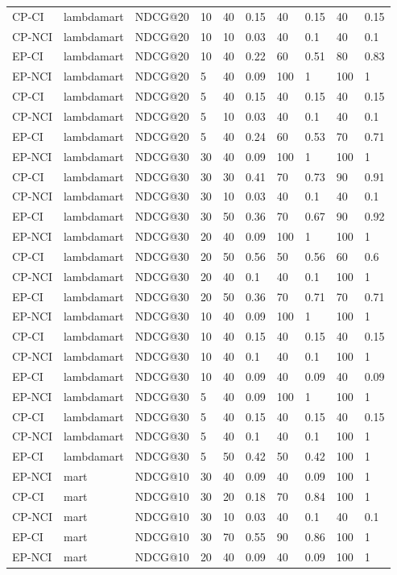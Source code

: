 \begin{landscape}
\begin{longtable}{|*{10}{l|}}
CP-CI&lambdamart&NDCG@20&10&40&0.15&40&0.15&40&0.15\\
CP-NCI&lambdamart&NDCG@20&10&10&0.03&40&0.1&40&0.1\\
EP-CI&lambdamart&NDCG@20&10&40&0.22&60&0.51&80&0.83\\
\hline
EP-NCI&lambdamart&NDCG@20&5&40&0.09&100&1&100&1\\
CP-CI&lambdamart&NDCG@20&5&40&0.15&40&0.15&40&0.15\\
CP-NCI&lambdamart&NDCG@20&5&10&0.03&40&0.1&40&0.1\\
EP-CI&lambdamart&NDCG@20&5&40&0.24&60&0.53&70&0.71\\
\hline
EP-NCI&lambdamart&NDCG@30&30&40&0.09&100&1&100&1\\
CP-CI&lambdamart&NDCG@30&30&30&0.41&70&0.73&90&0.91\\
CP-NCI&lambdamart&NDCG@30&30&10&0.03&40&0.1&40&0.1\\
EP-CI&lambdamart&NDCG@30&30&50&0.36&70&0.67&90&0.92\\
\hline
EP-NCI&lambdamart&NDCG@30&20&40&0.09&100&1&100&1\\
CP-CI&lambdamart&NDCG@30&20&50&0.56&50&0.56&60&0.6\\
CP-NCI&lambdamart&NDCG@30&20&40&0.1&40&0.1&100&1\\
EP-CI&lambdamart&NDCG@30&20&50&0.36&70&0.71&70&0.71\\
\hline
EP-NCI&lambdamart&NDCG@30&10&40&0.09&100&1&100&1\\
CP-CI&lambdamart&NDCG@30&10&40&0.15&40&0.15&40&0.15\\
CP-NCI&lambdamart&NDCG@30&10&40&0.1&40&0.1&100&1\\
EP-CI&lambdamart&NDCG@30&10&40&0.09&40&0.09&40&0.09\\
\hline
EP-NCI&lambdamart&NDCG@30&5&40&0.09&100&1&100&1\\
CP-CI&lambdamart&NDCG@30&5&40&0.15&40&0.15&40&0.15\\
CP-NCI&lambdamart&NDCG@30&5&40&0.1&40&0.1&100&1\\
EP-CI&lambdamart&NDCG@30&5&50&0.42&50&0.42&100&1\\
\hline
EP-NCI&mart&NDCG@10&30&40&0.09&40&0.09&100&1\\
CP-CI&mart&NDCG@10&30&20&0.18&70&0.84&100&1\\
CP-NCI&mart&NDCG@10&30&10&0.03&40&0.1&40&0.1\\
EP-CI&mart&NDCG@10&30&70&0.55&90&0.86&100&1\\
\hline
EP-NCI&mart&NDCG@10&20&40&0.09&40&0.09&100&1\\

\end{longtable}
\end{landscape}

